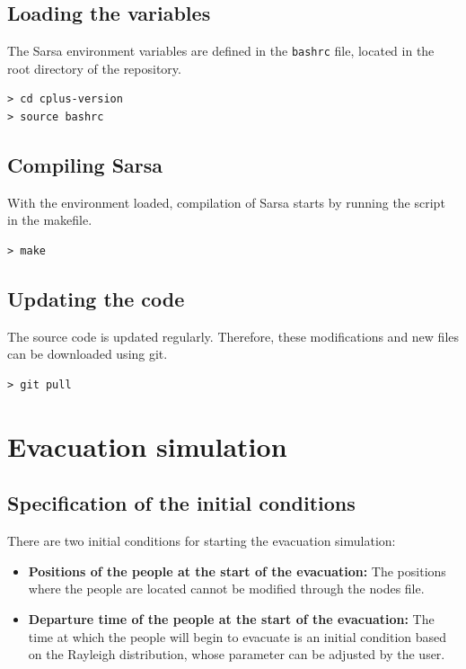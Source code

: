 \documentclass[12pt,a4paper]{book}
\begin{document}
\section{Loading the variables}
The Sarsa environment variables are defined in the \texttt{bashrc} file, located in the root
directory of the repository.
\begin{lstlisting}[style=shell]
> cd cplus-version
> source bashrc
\end{lstlisting}

\section{Compiling Sarsa}
With the environment loaded, compilation of Sarsa starts by running the script in the makefile.
\begin{lstlisting}[style=shell]
> make
\end{lstlisting}

\section{Updating the code}
The source code is updated regularly. Therefore, these modifications and new files can be
downloaded using git.
\begin{lstlisting}[style=shell]
> git pull
\end{lstlisting}

\chapter{Evacuation simulation}

\section{Specification of the initial conditions}
There are two initial conditions for starting the evacuation simulation:
\begin{itemize}
  \item \textbf{Positions of the people at the start of the evacuation:} The positions where the
    people are located cannot be modified through the nodes file.
  \item \textbf{Departure time of the people at the start of the evacuation:} The time at which the
    people will begin to evacuate is an initial condition based on the Rayleigh distribution, whose
    parameter can be adjusted by the user.
\end{itemize}
\end{document}
